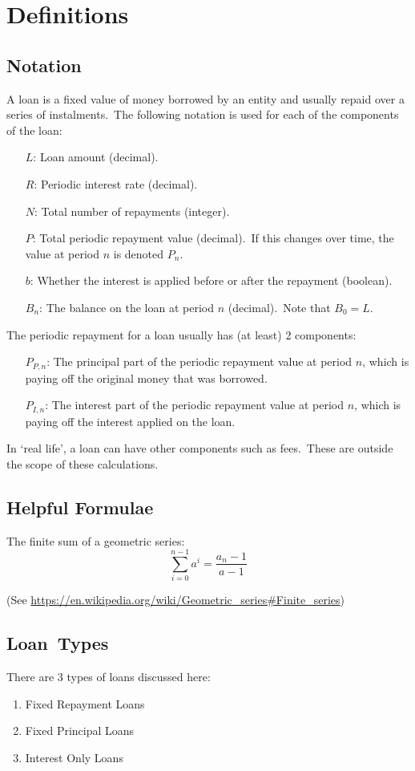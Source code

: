 
\section{Definitions}\label{sec:definitions}


\subsection{Notation}\label{subsec:notation}

A loan is a fixed value of money borrowed by an entity and usually repaid over a series of instalments.\ The following notation is used for each of the components of the loan:
\begin{itemize}
    \item[\(L\):] Loan amount (decimal).
    \item[\(R\):] Periodic interest rate (decimal).
    \item[\(N\):] Total number of repayments (integer).
    \item[\(P\):] Total periodic repayment value (decimal).\ If this changes over time, the value at period \(n\) is denoted \(P_{n}\).
    \item[\(b\):] Whether the interest is applied before or after the repayment (boolean).
    \item[\(B_{n}\):] The balance on the loan at period \(n\) (decimal).\ Note that \(B_{0} = L\).
\end{itemize}

The periodic repayment for a loan usually has (at least) 2 components:
\begin{itemize}
    \item[\(P_{P, n}\):] The principal part of the periodic repayment value at period \(n\), which is paying off the original money that was borrowed.
    \item[\(P_{I, n}\):] The interest part of the periodic repayment value at period \(n\), which is paying off the interest applied on the loan.
\end{itemize}

In `real life', a loan can have other components such as fees.\ These are outside the scope of these calculations.


\subsection{Helpful Formulae}\label{subsec:helpful-formulae}

The finite sum of a geometric series:
\begin{equation*}
    \sum_{i = 0}^{n - 1} a^{i} = \frac{a_{n} - 1}{a - 1}
\end{equation*}

(See \url{https://en.wikipedia.org/wiki/Geometric\_series\#Finite\_series})


\subsection{Loan~Types}\label{subsec:loan-types}
There are 3 types of loans discussed here:
\begin{enumerate}
    \item Fixed Repayment Loans
    \item Fixed Principal Loans
    \item Interest Only Loans
\end{enumerate}
